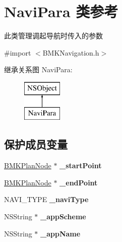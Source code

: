 \hypertarget{interface_navi_para}{\section{Navi\-Para 类参考}
\label{interface_navi_para}
}


此类管理调起导航时传入的参数  




{\ttfamily \#import $<$B\-M\-K\-Navigation.\-h$>$}

继承关系图 Navi\-Para\-:\begin{figure}[H]
\begin{center}
\leavevmode
\includegraphics[height=2.000000cm]{interface_navi_para}
\end{center}
\end{figure}
\subsection*{保护成员变量}
\begin{DoxyCompactItemize}
\item 
\hypertarget{interface_navi_para_a3334a3ec286c1c3d48e2aea05548dce0}{\hyperlink{interface_b_m_k_plan_node}{B\-M\-K\-Plan\-Node} $\ast$ {\bfseries \-\_\-start\-Point}}\label{interface_navi_para_a3334a3ec286c1c3d48e2aea05548dce0}

\item 
\hypertarget{interface_navi_para_a8b0e52a1495f4cfe6395a7fb3715b728}{\hyperlink{interface_b_m_k_plan_node}{B\-M\-K\-Plan\-Node} $\ast$ {\bfseries \-\_\-end\-Point}}\label{interface_navi_para_a8b0e52a1495f4cfe6395a7fb3715b728}

\item 
\hypertarget{interface_navi_para_ae95cb3d5a0a6fd2a05a16bf3b696449a}{N\-A\-V\-I\-\_\-\-T\-Y\-P\-E {\bfseries \-\_\-navi\-Type}}\label{interface_navi_para_ae95cb3d5a0a6fd2a05a16bf3b696449a}

\item 
\hypertarget{interface_navi_para_a6dcf87719a1d68284bf45172cdba6726}{N\-S\-String $\ast$ {\bfseries \-\_\-app\-Scheme}}\label{interface_navi_para_a6dcf87719a1d68284bf45172cdba6726}

\item 
\hypertarget{interface_navi_para_a3d53124f1fa4208656dff92db51cae1e}{N\-S\-String $\ast$ {\bfseries \-\_\-app\-Name}}\label{interface_navi_para_a3d53124f1fa4208656dff92db51cae1e}

\end{DoxyCompactItemize}

